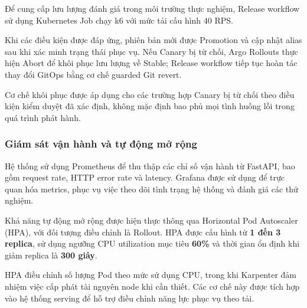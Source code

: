 Để cung cấp lưu lượng đánh giá trong môi trường thực nghiệm, Release workflow sử dụng Kubernetes Job chạy k6 với mức tải cấu hình 40 RPS.


Khi các điều kiện được đáp ứng, phiên bản mới được Promotion và cập nhật alias  sau khi xác minh trạng thái phục vụ. Nếu Canary bị từ chối, Argo Rollouts thực hiện Abort để khôi phục lưu lượng về Stable; Release workflow tiếp tục hoàn tác thay đổi GitOps bằng cơ chế guarded Git revert.


Cơ chế khôi phục được áp dụng cho các trường hợp Canary bị từ chối theo điều kiện kiểm duyệt đã xác định, không mặc định bao phủ mọi tình huống lỗi trong quá trình phát hành.


\subsubsection{Giám sát vận hành và tự động mở rộng}


Hệ thống sử dụng Prometheus để thu thập các chỉ số vận hành từ FastAPI, bao gồm request rate, HTTP error rate và latency. Grafana được sử dụng để trực quan hóa metrics, phục vụ việc theo dõi tình trạng hệ thống và đánh giá các thử nghiệm.


Khả năng tự động mở rộng được hiện thực thông qua Horizontal Pod Autoscaler (HPA), với đối tượng điều chỉnh là  Rollout. HPA được cấu hình từ \textbf{1 đến 3 replica}, sử dụng ngưỡng CPU utilization mục tiêu \textbf{60\%} và thời gian ổn định khi giảm replica là \textbf{300 giây}.


HPA điều chỉnh số lượng Pod theo mức sử dụng CPU, trong khi Karpenter đảm nhiệm việc cấp phát tài nguyên node khi cần thiết. Các cơ chế này được tích hợp vào hệ thống serving để hỗ trợ điều chỉnh năng lực phục vụ theo tải.


